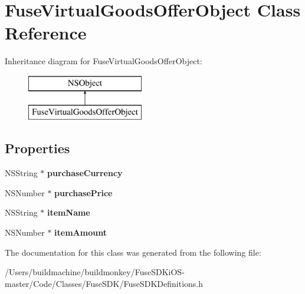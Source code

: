\hypertarget{interface_fuse_virtual_goods_offer_object}{}\section{Fuse\+Virtual\+Goods\+Offer\+Object Class Reference}
\label{interface_fuse_virtual_goods_offer_object}
Inheritance diagram for Fuse\+Virtual\+Goods\+Offer\+Object\+:\begin{figure}[H]
\begin{center}
\leavevmode
\includegraphics[height=2.000000cm]{interface_fuse_virtual_goods_offer_object}
\end{center}
\end{figure}
\subsection*{Properties}
\begin{DoxyCompactItemize}
\item 
\hypertarget{interface_fuse_virtual_goods_offer_object_a60cbcab572527ebc765b0fcbba5e1bdc}{}N\+S\+String $\ast$ {\bfseries purchase\+Currency}\label{interface_fuse_virtual_goods_offer_object_a60cbcab572527ebc765b0fcbba5e1bdc}

\item 
\hypertarget{interface_fuse_virtual_goods_offer_object_a860943b511058dbaace8344976c6000f}{}N\+S\+Number $\ast$ {\bfseries purchase\+Price}\label{interface_fuse_virtual_goods_offer_object_a860943b511058dbaace8344976c6000f}

\item 
\hypertarget{interface_fuse_virtual_goods_offer_object_afc44eae0ea1010ef7b02515dfc156e68}{}N\+S\+String $\ast$ {\bfseries item\+Name}\label{interface_fuse_virtual_goods_offer_object_afc44eae0ea1010ef7b02515dfc156e68}

\item 
\hypertarget{interface_fuse_virtual_goods_offer_object_a3eb537b8ee870de5085c035c1de25a31}{}N\+S\+Number $\ast$ {\bfseries item\+Amount}\label{interface_fuse_virtual_goods_offer_object_a3eb537b8ee870de5085c035c1de25a31}

\end{DoxyCompactItemize}


The documentation for this class was generated from the following file\+:\begin{DoxyCompactItemize}
\item 
/\+Users/buildmachine/buildmonkey/\+Fuse\+S\+D\+Ki\+O\+S-\/master/\+Code/\+Classes/\+Fuse\+S\+D\+K/Fuse\+S\+D\+K\+Definitions.\+h\end{DoxyCompactItemize}
